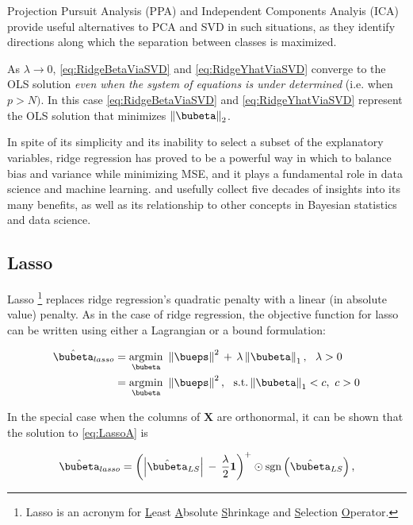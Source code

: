 \documentclass[graybox,envcountchap,sectrefs]{svmono}\usepackage[]{graphicx}\usepackage[]{xcolor}
\begin{document}
\begin{appendices}
Projection Pursuit Analysis (PPA) and Independent Components Analyis
(ICA) provide useful alternatives to PCA and SVD in such situations,
as they identify directions along which the separation between classes
is maximized. 

As $\lambda\longrightarrow0$, \eqref{eq:RidgeBetaViaSVD} and \eqref{eq:RidgeYhatViaSVD}
converge to the OLS solution \emph{even when the system of equations
is under determined} (i.e. when $p>N)$. In this case \eqref{eq:RidgeBetaViaSVD}
and \eqref{eq:RidgeYhatViaSVD} represent the OLS solution that minimizes
$\left\Vert \bubeta\right\Vert _{2}$.

In spite of its simplicity and its inability to select a subset of
the explanatory variables, ridge regression has proved to be a powerful
way in which to balance bias and variance while minimizing MSE, and
it plays a fundamental role in data science and machine learning.
\citet{Hastie2020} and \citet{vanWieringen2023} usefully collect
five decades of insights into its many benefits, as well as its relationship
to other concepts in Bayesian statistics and data science.

\subsection{Lasso }

Lasso \footnote{Lasso is an acronym for \uline{L}east \uline{A}bsolute \uline{S}hrinkage
and \uline{S}election \uline{O}perator.} replaces ridge regression's quadratic penalty with a linear (in absolute
value) penalty. As in the case of ridge regression, the objective
function for lasso can be written using either a Lagrangian or a bound
formulation:

\begin{subequations}
\begin{align}
\hat{\bubeta}_{lasso} & =\underset{\bubeta}{\mathrm{argmin}}\ \left\Vert \bueps\right\Vert ^{2}\,+\,\lambda\left\Vert \bubeta\right\Vert _{1},\ \ \lambda>0\label{eq:LassoA}\\
 & =\underset{\bubeta}{\mathrm{argmin}}\ \left\Vert \bueps\right\Vert ^{2},\ \ \mathrm{s.t.}\left\Vert \bubeta\right\Vert _{1}<c,\ c>0\label{eq:LassoB}
\end{align}
\end{subequations}

In the special case when the columns of $\mathbf{X}$ are orthonormal,
it can be shown that the solution to \eqref{eq:LassoA} is

\begin{equation}
\hat{\bubeta}_{lasso}=\left(\left|\hat{\bubeta}_{LS}\right|\,-\,\frac{\lambda}{2}\boldsymbol{1}\right)^{+}\odot\mathrm{sgn}\left(\hat{\bubeta}_{LS}\right),\label{eq:LassovsLSbeta}
\end{equation}


\end{appendices}
\end{document}
